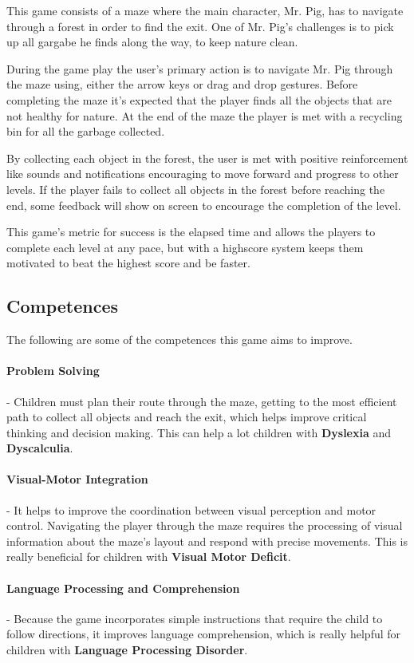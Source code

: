 This game consists of a maze where the main character, Mr. Pig, has to navigate through a forest in order to find the exit. One of Mr. Pig's challenges is to pick up all gargabe he finds along the way, to keep nature clean.

During the game play the user's primary action is to navigate Mr. Pig through the maze using, either the arrow keys or drag and drop gestures. Before completing the maze it's expected that the player finds all the objects that are not healthy for nature.
At the end of the maze the player is met with a recycling bin for all the garbage collected.

By collecting each object in the forest, the user is met with positive reinforcement like sounds and notifications encouraging to move forward and progress to other levels. If the player fails to collect all objects in the forest before reaching the end, some feedback will show on screen to encourage the completion of the level.

This game's metric for success is the elapsed time and allows the players to complete each level at any pace, but with a highscore system keeps them motivated to beat the highest score and be faster.

\subsection*{Competences}
The following are some of the competences this game aims to improve.

\paragraph{Problem Solving}- Children must plan their route through the maze, getting to the most efficient path to collect all objects and reach the exit, which helps improve critical thinking and decision making. This can help a lot children with \textbf{Dyslexia} and \textbf{Dyscalculia}.

\paragraph{Visual-Motor Integration}- It helps to improve the coordination between visual perception and motor control. Navigating the player through the maze requires the processing of visual information about the maze's layout and respond with precise movements. This is really beneficial for children with \textbf{Visual Motor Deficit}.

\paragraph{Language Processing and Comprehension}- Because the game incorporates simple instructions that require the child to follow directions, it improves language comprehension, which is really helpful for children with \textbf{Language Processing Disorder}.

